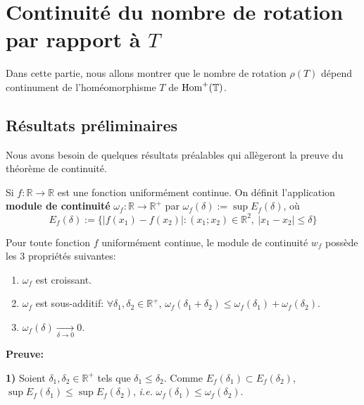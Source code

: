 \section{Continuité du nombre de rotation par rapport à $T$}

Dans cette partie, nous allons montrer que le nombre de rotation $\rho(T)$ dépend continument de l'homéomorphisme $T$ de $\mathrm{Hom}^+({\mathbb{T}})$.

\subsection{Résultats préliminaires}

Nous avons besoin de quelques résultats préalables qui allègeront la preuve du théorème de continuité.
\begin{definition}
		Si $f:\mathbb{R} \to \mathbb{R}$ est une fonction uniformément continue. On définit l'application \textbf{module de continuité} $\omega_f: \mathbb{R} \to \mathbb{R}^+$ par $\omega_f(\delta) := \sup E_{f}(\delta)$, où
		$$E_{f}(\delta):=\lbrace |f(x_1) - f(x_2)|: (x_1;x_2) \in \mathbb{R}^2,\ |x_1 - x_2| \leq \delta \rbrace$$
\end{definition}









\begin{proposition}\label{modulecont}
		Pour toute fonction $f$ uniformément continue, le  module de continuité $w_f$ possède les 3 propriétés suivantes:
	\begin{enumerate}
		\item $\omega_f$ est croissant.
		\item $\omega_f$ est sous-additif: $\forall \delta_1, \delta_2 \in \mathbb{R}^+$, $\omega_f(\delta_1 + \delta_2) \leq \omega_f(\delta_1) +\omega_f(\delta_2)$.
		\item $\omega_f(\delta) \underset{\delta \to 0}{\longrightarrow}0$.
	\end{enumerate}
\end{proposition}



	\textbf{Preuve:}
	\par \textbf{1)} Soient $\delta_1,\delta_2 \in \mathbb{R}^+$ tels que $\delta_1\leq \delta_2$. Comme $E_f(\delta_1)\subset E_f(\delta_2)$, $\sup E_f(\delta_1)\leq \sup E_f(\delta_2)$, \textit{i.e.} $\omega_f(\delta_1)\leq \omega_f(\delta_2)$.\\

